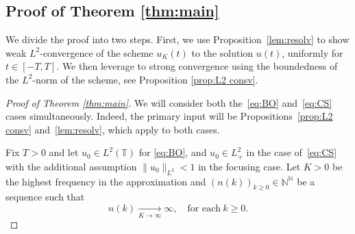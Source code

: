 \documentclass [11pt] {article}
\newcommand{\<}{\langle}
\renewcommand{\>}{\rangle}
\begin{document}



\subsection{Proof of Theorem \ref{thm:main}}\label{sec:pfThms}
We divide the proof into two steps. First, we use Proposition~\ref{lem:resolv} to show weak $L^2$-convergence of the scheme $u_{K}(t)$ to the solution $u(t)$, uniformly for $t\in[-T,T]$. We then leverage to strong convergence using the boundedness of the $L^2$-norm of the scheme, see Proposition \ref{prop:L2 consv}.

\begin{proof}[Proof of Theorem \ref{thm:main}]
We will consider both the~\eqref{eq:BO} and~\eqref{eq:CS} cases simultaneously.  Indeed, the primary input will be Propositions~\ref{prop:L2 consv} and~\ref{lem:resolv}, which apply to both cases.

Fix $T>0$ and let $u_0\in L^2(\mathbb T)$ for \eqref{eq:BO}, and $u_0\in L^2_+$ in the case of~\eqref{eq:CS} with the additional assumption $\| u_0\|_{L^2} < 1$ in the focusing case. 
Let $K>0$ be the highest frequency in the approximation and $(n(k))_{k\ge 0}\in\mathbb N^{\mathbb{N}}$ be a sequence such that
\[
n(k)\xrightarrow[K\to\infty]{}\infty , \quad \text{for  each} \ k\ge 0.
\]


\end{proof}
\end{document}
